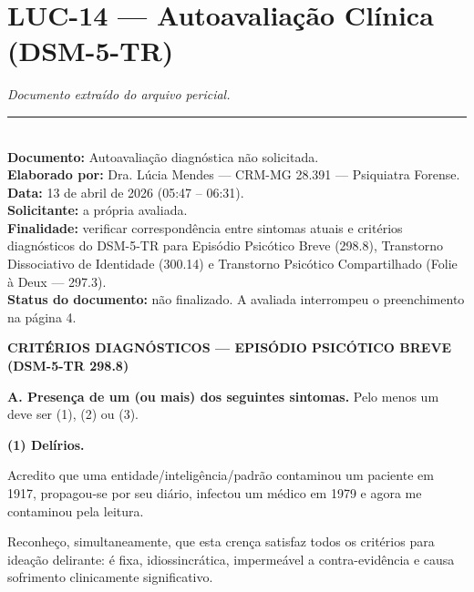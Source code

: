 \section*{\textbf{LUC-14} --- Autoavaliação Clínica (DSM-5-TR)}

\noindent \textit{Documento extraído do arquivo pericial.}

\vspace{0.5em}\noindent\rule{\textwidth}{0.5pt}\vspace{0.5em}

\\[-0.2em]

\noindent\textbf{Documento:} Autoavaliação diagnóstica não solicitada.\\
\noindent \textbf{Elaborado por:} Dra. Lúcia Mendes — CRM-MG 28.391 — Psiquiatra Forense.\\
\noindent\textbf{Data:} 13 de abril de 2026 (05:47 -- 06:31).\\
\noindent \textbf{Solicitante:} a própria avaliada.\\
\noindent \textbf{Finalidade:} verificar correspondência entre sintomas atuais e critérios
\noindent diagnósticos do DSM-5-TR para Episódio Psicótico Breve (298.8),
\noindent Transtorno Dissociativo de Identidade (300.14) e Transtorno Psicótico
\noindent Compartilhado (Folie à Deux — 297.3).\\
\noindent \textbf{Status do documento:} não finalizado. A avaliada interrompeu o
\noindent preenchimento na página 4.

\noindent \textbf{CRITÉRIOS DIAGNÓSTICOS --- EPISÓDIO PSICÓTICO BREVE (DSM-5-TR 298.8)}

\textbf{A. Presença de um (ou mais) dos seguintes sintomas.}
\noindent Pelo menos um deve ser (1), (2) ou (3).

\noindent \textbf{(1) Delírios.}

\noindent Acredito que uma entidade\slash inteligência\slash padrão
\noindent contaminou um paciente em 1917, propagou-se por seu diário,
\noindent infectou um médico em 1979 e agora me contaminou pela leitura.

\noindent Reconheço, simultaneamente, que esta crença satisfaz
\noindent todos os critérios para ideação delirante: é fixa, idiossincrática,
\noindent impermeável a contra-evidência e causa sofrimento clinicamente significativo.

